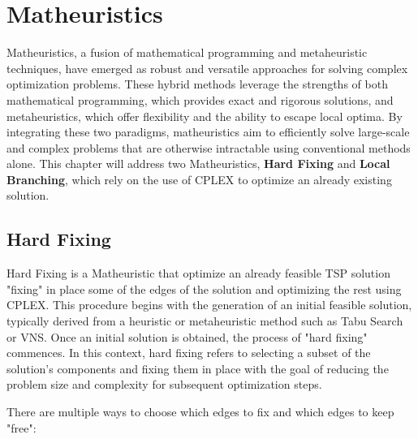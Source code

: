 \chapter{Matheuristics}
Matheuristics, a fusion of mathematical programming and metaheuristic techniques, have emerged as robust and versatile approaches for solving complex optimization problems.
These hybrid methods leverage the strengths of both mathematical programming, which provides exact and rigorous solutions, and metaheuristics, which offer flexibility and the ability to escape local optima.
By integrating these two paradigms, matheuristics aim to efficiently solve large-scale and complex problems that are otherwise intractable using conventional methods alone.
This chapter will address two Matheuristics, \textbf{Hard Fixing} and \textbf{Local Branching}, which rely on the use of CPLEX to optimize an already existing solution.

\section{Hard Fixing}
Hard Fixing is a Matheuristic that optimize an already feasible TSP solution "fixing" in place some of the edges of the solution and optimizing the rest using CPLEX.
This procedure begins with the generation of an initial feasible solution, typically derived from a heuristic or metaheuristic method such as Tabu Search or VNS.
Once an initial solution is obtained, the process of "hard fixing" commences.
In this context, hard fixing refers to selecting a subset of the solution's components and fixing them in place with the goal of reducing the problem size and complexity for subsequent optimization steps.

There are multiple ways to choose which edges to fix and which edges to keep "free":

